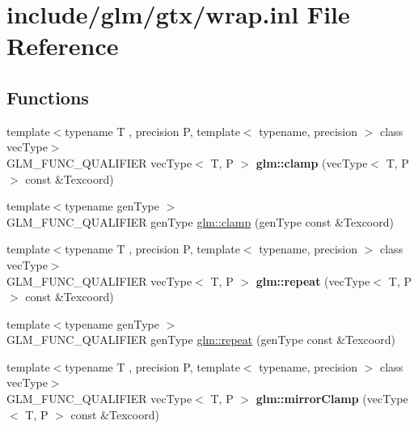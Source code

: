 \hypertarget{wrap_8inl}{}\section{include/glm/gtx/wrap.inl File Reference}
\label{wrap_8inl}
\subsection*{Functions}
\begin{DoxyCompactItemize}
\item 
\mbox{\label{wrap_8inl_a60133991ee6051962489d4e30ee13417}} 
{\footnotesize template$<$typename T , precision P, template$<$ typename, precision $>$ class vec\+Type$>$ }\\G\+L\+M\+\_\+\+F\+U\+N\+C\+\_\+\+Q\+U\+A\+L\+I\+F\+I\+ER vec\+Type$<$ T, P $>$ {\bfseries glm\+::clamp} (vec\+Type$<$ T, P $>$ const \&Texcoord)
\item 
{\footnotesize template$<$typename gen\+Type $>$ }\\G\+L\+M\+\_\+\+F\+U\+N\+C\+\_\+\+Q\+U\+A\+L\+I\+F\+I\+ER gen\+Type \hyperlink{group__gtx__wrap_ga6c0cc6bd1d67ea1008d2592e998bad33}{glm\+::clamp} (gen\+Type const \&Texcoord)
\item 
\mbox{\label{wrap_8inl_ac4c923ddb75730f17cc23201a6d3759c}} 
{\footnotesize template$<$typename T , precision P, template$<$ typename, precision $>$ class vec\+Type$>$ }\\G\+L\+M\+\_\+\+F\+U\+N\+C\+\_\+\+Q\+U\+A\+L\+I\+F\+I\+ER vec\+Type$<$ T, P $>$ {\bfseries glm\+::repeat} (vec\+Type$<$ T, P $>$ const \&Texcoord)
\item 
{\footnotesize template$<$typename gen\+Type $>$ }\\G\+L\+M\+\_\+\+F\+U\+N\+C\+\_\+\+Q\+U\+A\+L\+I\+F\+I\+ER gen\+Type \hyperlink{group__gtx__wrap_ga809650c6310ea7c42666e918c117fb6f}{glm\+::repeat} (gen\+Type const \&Texcoord)
\item 
\mbox{\label{wrap_8inl_aa53ab6c4ce8a2f0adcbf36c5cbea6685}} 
{\footnotesize template$<$typename T , precision P, template$<$ typename, precision $>$ class vec\+Type$>$ }\\G\+L\+M\+\_\+\+F\+U\+N\+C\+\_\+\+Q\+U\+A\+L\+I\+F\+I\+ER vec\+Type$<$ T, P $>$ {\bfseries glm\+::mirror\+Clamp} (vec\+Type$<$ T, P $>$ const \&Texcoord)
\item 

\end{DoxyCompactItemize}
